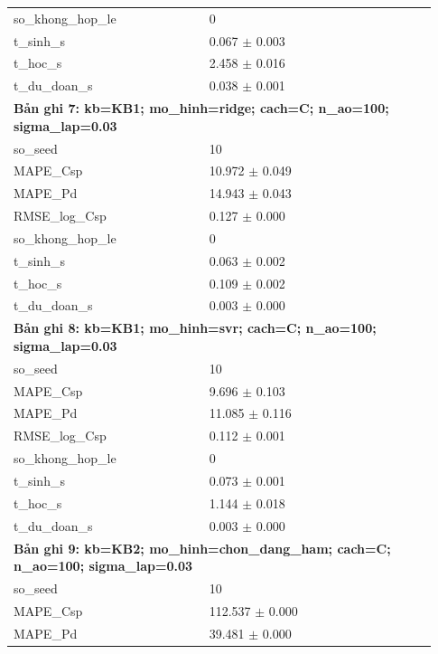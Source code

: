 \begin{longtable}{p{0.43\linewidth}p{0.50\linewidth}}
so\_\allowbreak khong\_\allowbreak hop\_\allowbreak le & 0 \\
t\_\allowbreak sinh\_\allowbreak s & 0.067 $\pm$ 0.003 \\
t\_\allowbreak hoc\_\allowbreak s & 2.458 $\pm$ 0.016 \\
t\_\allowbreak du\_\allowbreak doan\_\allowbreak s & 0.038 $\pm$ 0.001 \\
\midrule
\multicolumn{2}{p{0.95\linewidth}}{\textbf{Bản ghi 7: kb=KB1; mo\_hinh=ridge; cach=C; n\_ao=100; sigma\_lap=0.03}} \\
so\_\allowbreak seed & 10 \\
MAPE\_\allowbreak Csp & 10.972 $\pm$ 0.049 \\
MAPE\_\allowbreak Pd & 14.943 $\pm$ 0.043 \\
RMSE\_\allowbreak log\_\allowbreak Csp & 0.127 $\pm$ 0.000 \\
so\_\allowbreak khong\_\allowbreak hop\_\allowbreak le & 0 \\
t\_\allowbreak sinh\_\allowbreak s & 0.063 $\pm$ 0.002 \\
t\_\allowbreak hoc\_\allowbreak s & 0.109 $\pm$ 0.002 \\
t\_\allowbreak du\_\allowbreak doan\_\allowbreak s & 0.003 $\pm$ 0.000 \\
\midrule
\multicolumn{2}{p{0.95\linewidth}}{\textbf{Bản ghi 8: kb=KB1; mo\_hinh=svr; cach=C; n\_ao=100; sigma\_lap=0.03}} \\
so\_\allowbreak seed & 10 \\
MAPE\_\allowbreak Csp & 9.696 $\pm$ 0.103 \\
MAPE\_\allowbreak Pd & 11.085 $\pm$ 0.116 \\
RMSE\_\allowbreak log\_\allowbreak Csp & 0.112 $\pm$ 0.001 \\
so\_\allowbreak khong\_\allowbreak hop\_\allowbreak le & 0 \\
t\_\allowbreak sinh\_\allowbreak s & 0.073 $\pm$ 0.001 \\
t\_\allowbreak hoc\_\allowbreak s & 1.144 $\pm$ 0.018 \\
t\_\allowbreak du\_\allowbreak doan\_\allowbreak s & 0.003 $\pm$ 0.000 \\
\midrule
\multicolumn{2}{p{0.95\linewidth}}{\textbf{Bản ghi 9: kb=KB2; mo\_hinh=chon\_dang\_ham; cach=C; n\_ao=100; sigma\_lap=0.03}} \\
so\_\allowbreak seed & 10 \\
MAPE\_\allowbreak Csp & 112.537 $\pm$ 0.000 \\
MAPE\_\allowbreak Pd & 39.481 $\pm$ 0.000 \\

\end{longtable}
